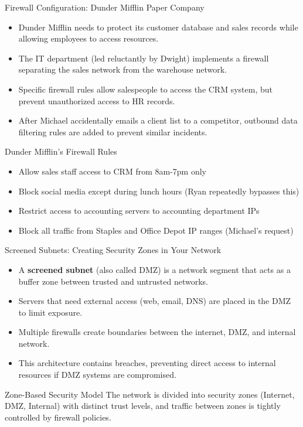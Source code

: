 \documentclass{beamer}
\begin{document}
    \begin{frame}{Firewall Configuration: Dunder Mifflin Paper Company}
        \begin{itemize}
            \item Dunder Mifflin needs to protect its customer database and sales records while allowing employees to access resources.
            \item The IT department (led reluctantly by Dwight) implements a firewall separating the sales network from the warehouse network.
            \item Specific firewall rules allow salespeople to access the CRM system, but prevent unauthorized access to HR records.
            \item After Michael accidentally emails a client list to a competitor, outbound data filtering rules are added to prevent similar incidents.
        \end{itemize}
        
        \begin{alertblock}{Dunder Mifflin's Firewall Rules}
        \begin{itemize}
            \item Allow sales staff access to CRM from 8am-7pm only
            \item Block social media except during lunch hours (Ryan repeatedly bypasses this)
            \item Restrict access to accounting servers to accounting department IPs
            \item Block all traffic from Staples and Office Depot IP ranges (Michael's request)
        \end{itemize}
        \end{alertblock}
        \end{frame}
    
    \begin{frame}{Screened Subnets: Creating Security Zones in Your Network}
    \begin{itemize}
        \item A \textbf{screened subnet} (also called DMZ) is a network segment that acts as a buffer zone between trusted and untrusted networks.
        \item Servers that need external access (web, email, DNS) are placed in the DMZ to limit exposure.
        \item Multiple firewalls create boundaries between the internet, DMZ, and internal network.
        \item This architecture contains breaches, preventing direct access to internal resources if DMZ systems are compromised.
    \end{itemize}
    
    \begin{block}{Zone-Based Security Model}
    The network is divided into security zones (Internet, DMZ, Internal) with distinct trust levels, and traffic between zones is tightly controlled by firewall policies.
    \end{block}
    \end{frame}
    
\end{document}
